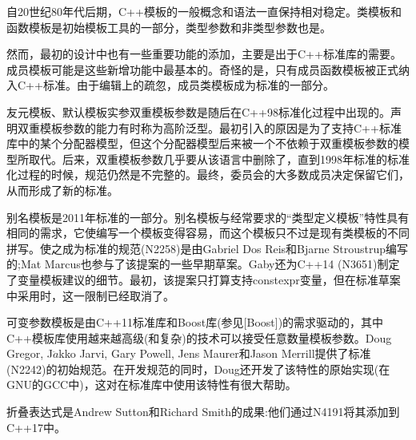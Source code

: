 自20世纪80年代后期，C++模板的一般概念和语法一直保持相对稳定。类模板和函数模板是初始模板工具的一部分，类型参数和非类型参数也是。

然而，最初的设计中也有一些重要功能的添加，主要是出于C++标准库的需要。成员模板可能是这些新增功能中最基本的。奇怪的是，只有成员函数模板被正式纳入C++标准。由于编辑上的疏忽，成员类模板成为标准的一部分。

友元模板、默认模板实参双重模板参数是随后在C++98标准化过程中出现的。声明双重模板参数的能力有时称为高阶泛型。最初引入的原因是为了支持C++标准库中的某个分配器模型，但这个分配器模型后来被一个不依赖于双重模板参数的模型所取代。后来，双重模板参数几乎要从该语言中删除了，直到1998年标准的标准化过程的时候，规范仍然是不完整的。最终，委员会的大多数成员决定保留它们，从而形成了新的标准。

别名模板是2011年标准的一部分。别名模板与经常要求的“类型定义模板”特性具有相同的需求，它使编写一个模板变得容易，而这个模板只不过是现有类模板的不同拼写。使之成为标准的规范(N2258)是由Gabriel Dos Reis和Bjarne Stroustrup编写的;Mat Marcus也参与了该提案的一些早期草案。Gaby还为C++14 (N3651)制定了变量模板建议的细节。最初，该提案只打算支持constexpr变量，但在标准草案中采用时，这一限制已经取消了。

可变参数模板是由C++11标准库和Boost库(参见[Boost])的需求驱动的，其中C++模板库使用越来越高级(和复杂)的技术可以接受任意数量模板参数。Doug Gregor, J$ \ddot{a} $kko Jarvi, Gary Powell, Jens Maurer和Jason Merrill提供了标准(N2242)的初始规范。在开发规范的同时，Doug还开发了该特性的原始实现(在GNU的GCC中)，这对在标准库中使用该特性有很大帮助。

折叠表达式是Andrew Sutton和Richard Smith的成果:他们通过N4191将其添加到C++17中。










